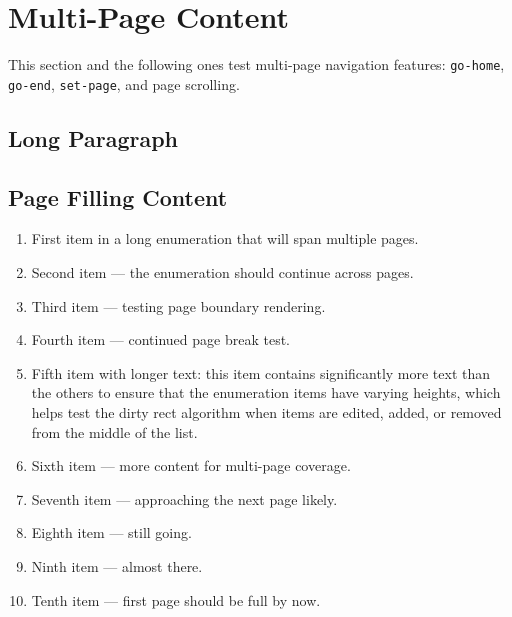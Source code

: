 \documentclass[12pt,a4paper]{article}
\begin{document}
\section{Multi-Page Content}
\label{sec:multipage}

This section and the following ones test multi-page navigation features:
\texttt{go-home}, \texttt{go-end}, \texttt{set-page}, and page scrolling.

\subsection{Long Paragraph}


\subsection{Page Filling Content}

\begin{enumerate}[label=\arabic*.]
  \item First item in a long enumeration that will span multiple pages.
  \item Second item — the enumeration should continue across pages.
  \item Third item — testing page boundary rendering.
  \item Fourth item — continued page break test.
  \item Fifth item with longer text: this item contains significantly more
        text than the others to ensure that the enumeration items have varying
        heights, which helps test the dirty rect algorithm when items are
        edited, added, or removed from the middle of the list.
  \item Sixth item — more content for multi-page coverage.
  \item Seventh item — approaching the next page likely.
  \item Eighth item — still going.
  \item Ninth item — almost there.
  \item Tenth item — first page should be full by now.
\end{enumerate}
\end{document}

